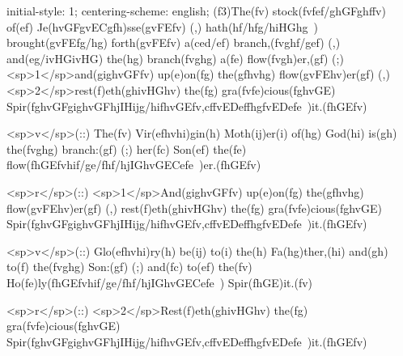 initial-style: 1;
centering-scheme: english;
(f3)The(fv) stock(fvfef/ghGFghffv) of(ef) Je(hvGFgvECgfh)sse(gvFEfv) (,) hath(hf/hfg/hiHGhg~) brought(gvFEfg/hg) forth(gvFEfv) a(ced/ef) branch,(fvghf/gef) (,) and(eg/ivHGivHG) the(hg) branch(fvghg) a(fe) flow(fvgh)er,(gf) (;) <sp>1</sp>and(gighvGFfv) up(e)on(fg) the(gfhvhg) flow(gvFEhv)er(gf) (,) <sp>2</sp>rest(f)eth(ghivHGhv) the(fg) gra(fvfe)cious(fghvGE) Spir(fghvGFgighvGFhjIHijg/hifhvGEfv,cffvEDeffhgfvEDefe~)it.(fhGEfv)

<sp>v</sp>(::) The(fv) Vir(efhvhi)gin(h) Moth(ij)er(i) of(hg) God(hi) is(gh) the(fvghg) branch:(gf) (;) her(fc) Son(ef) the(fe) flow(fhGEfvhif/ge/fhf/hjIGhvGECefe~)er.(fhGEfv)

<sp>r</sp>(::) <sp>1</sp>And(gighvGFfv) up(e)on(fg) the(gfhvhg) flow(gvFEhv)er(gf) (,) rest(f)eth(ghivHGhv) the(fg) gra(fvfe)cious(fghvGE) Spir(fghvGFgighvGFhjIHijg/hifhvGEfv,cffvEDeffhgfvEDefe~)it.(fhGEfv)

<sp>v</sp>(::) Glo(efhvhi)ry(h) be(ij) to(i) the(h) Fa(hg)ther,(hi) and(gh) to(f) the(fvghg) Son:(gf) (;) and(fc) to(ef) the(fv) Ho(fe)ly(fhGEfvhif/ge/fhf/hjIGhvGECefe~) Spir(fhGE)it.(fv)

<sp>r</sp>(::) <sp>2</sp>Rest(f)eth(ghivHGhv) the(fg) gra(fvfe)cious(fghvGE) Spir(fghvGFgighvGFhjIHijg/hifhvGEfv,cffvEDeffhgfvEDefe~)it.(fhGEfv)